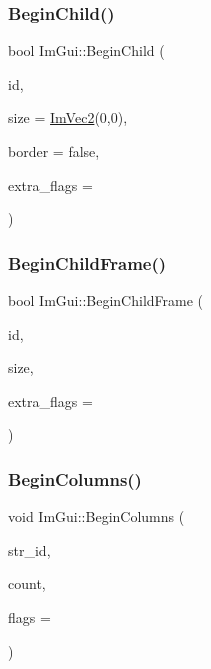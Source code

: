 \hypertarget{namespace_im_gui_a3320a3f36d9d8b227f93a015792379d3}{}\label{namespace_im_gui_a3320a3f36d9d8b227f93a015792379d3} 
\subsubsection{\texorpdfstring{Begin\+Child()}{BeginChild()}\hspace{0.1cm}{\footnotesize\ttfamily [2/2]}}
{\footnotesize\ttfamily bool Im\+Gui\+::\+Begin\+Child (\begin{DoxyParamCaption}\item[{Im\+Gui\+ID}]{id,  }\item[{const \hyperlink{struct_im_vec2}{Im\+Vec2} \&}]{size = {\ttfamily \hyperlink{struct_im_vec2}{Im\+Vec2}(0,0)},  }\item[{bool}]{border = {\ttfamily false},  }\item[{Im\+Gui\+Window\+Flags}]{extra\+\_\+flags = {} }\end{DoxyParamCaption})}

\hypertarget{namespace_im_gui_a26d6981a769d3fbe9be9a25975b5dc6b}{}\label{namespace_im_gui_a26d6981a769d3fbe9be9a25975b5dc6b} 
\subsubsection{\texorpdfstring{Begin\+Child\+Frame()}{BeginChildFrame()}}
{\footnotesize\ttfamily bool Im\+Gui\+::\+Begin\+Child\+Frame (\begin{DoxyParamCaption}\item[{Im\+Gui\+ID}]{id,  }\item[{const \hyperlink{struct_im_vec2}{Im\+Vec2} \&}]{size,  }\item[{Im\+Gui\+Window\+Flags}]{extra\+\_\+flags = {} }\end{DoxyParamCaption})}

\hypertarget{namespace_im_gui_a6992289cbdb087a690403e48340bfb23}{}\label{namespace_im_gui_a6992289cbdb087a690403e48340bfb23} 
\subsubsection{\texorpdfstring{Begin\+Columns()}{BeginColumns()}}
{\footnotesize\ttfamily void Im\+Gui\+::\+Begin\+Columns (\begin{DoxyParamCaption}\item[{const char $\ast$}]{str\+\_\+id,  }\item[{int}]{count,  }\item[{Im\+Gui\+Columns\+Flags}]{flags = {} }\end{DoxyParamCaption})}

